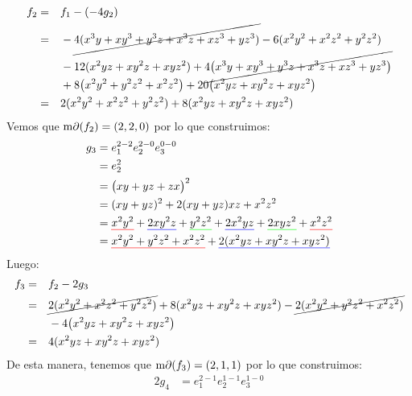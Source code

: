 \begin{solucion}
    \begin{alignat*}{2}
        f_{2}&=&&f_{1}-(-4g_{2})\\
        &=&&-\cancel{4(x^{3}y+ xy^{3} + y^{3}z + x^{3}z + xz^{3} + yz^{3})} - 6(x^{2}y^{2} + x^{2}z^{2} + y^{2}z^{2})\\
        & &&-12(x^{2}yz + xy^{2}z + xyz^{2})+\cancel{4\bigl(x^{3}y + xy^{3} + y^{3}z + x^{3}z + xz^{3} + yz^{3}\bigr)}\\
        & && + 8\bigl(x^{2}y^{2} + y^{2}z^{2}+x^{2}z^{2}\bigr)+20\bigl(x^{2}yz + xy^{2}z + xyz^{2}\bigr)\\
        &=&&2(x^{2}y^{2} + x^{2}z^{2} + y^{2}z^{2}) + 8(x^{2}yz + xy^{2}z + xyz^{2})\\
    \end{alignat*}
    Vemos que $\operatorname{m\partial}(f_{2})=(2,2,0)$ por lo que construimos:
    \begin{alignat*}{2}
        g_3 &=e_1^{2-2}e_2^{2-0}e_3^{0-0}\\
            &=e_2^{2}\\
            &=\bigl(xy + yz + zx\bigr)^{2}\\
            &=(xy + yz)^2 + 2(xy + yz)xz + x^2z^2\\
            &=\text{\setulcolor{red}\ul{$x^2y^2$}}
              +\text{\setulcolor{blue}\ul{$2xy^2z$}}
              +\text{\setulcolor{green}\ul{$y^2z^2$}}
              +\text{\setulcolor{blue}\ul{$2x^2yz$}}
              +\text{\setulcolor{green}\ul{$2xyz^2$}}
              +\text{\setulcolor{red}\ul{$x^2z^2$}}\\
            &= \text{\setulcolor{red}\ul{$x^2y^2 + y^2z^2 + x^2z^2$}}
              +\text{\setulcolor{blue}\ul{$2(x^2yz + xy^2z + xyz^2)$}}\\
    \end{alignat*}
    Luego:
    \begin{alignat*}{2}
        f_{3}&=&&f_{2}-2g_{3}\\
        &=&&\cancel{2(x^{2}y^{2} + x^{2}z^{2} + y^{2}z^{2})} + 8(x^{2}yz + xy^{2}z + xyz^{2})-\cancel{2(x^{2}y^{2} + y^{2}z^{2} + x^{2}z^{2})}\\
        & && - 4\bigl(x^{2}yz + xy^{2}z + xyz^{2}\bigr)\\
        &=&&4(x^{2}yz + xy^{2}z + xyz^{2})\\
    \end{alignat*}
    De esta manera, tenemos que $\operatorname{m\partial}(f_{3})=(2,1,1)$ por lo que construimos:
    \begin{alignat*}{2}
        g_4 &=e_1^{2-1}e_2^{1-1}e_3^{1-0}\\

\end{alignat*}
\end{solucion}
